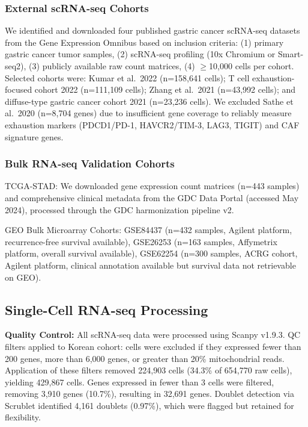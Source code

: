 \documentclass[12pt,twoside]{article}
\begin{document}
\subsubsection{External scRNA-seq Cohorts}

We identified and downloaded four published gastric cancer scRNA-seq datasets from the Gene Expression Omnibus based on inclusion criteria: (1) primary gastric cancer tumor samples, (2) scRNA-seq profiling (10x Chromium or Smart-seq2), (3) publicly available raw count matrices, (4) $\geq$10,000 cells per cohort. Selected cohorts were: Kumar et al.\ 2022 (n=158,641 cells); T cell exhaustion-focused cohort 2022 (n=111,109 cells); Zhang et al.\ 2021 (n=43,992 cells); and diffuse-type gastric cancer cohort 2021 (n=23,236 cells). We excluded Sathe et al.\ 2020 (n=8,704 genes) due to insufficient gene coverage to reliably measure exhaustion markers (PDCD1/PD-1, HAVCR2/TIM-3, LAG3, TIGIT) and CAF signature genes.

\subsubsection{Bulk RNA-seq Validation Cohorts}

TCGA-STAD: We downloaded gene expression count matrices (n=443 samples) and comprehensive clinical metadata from the GDC Data Portal (accessed May 2024), processed through the GDC harmonization pipeline v2.

GEO Bulk Microarray Cohorts: GSE84437 (n=432 samples, Agilent platform, recurrence-free survival available), GSE26253 (n=163 samples, Affymetrix platform, overall survival available), GSE62254 (n=300 samples, ACRG cohort, Agilent platform, clinical annotation available but survival data not retrievable on GEO).

\subsection{Single-Cell RNA-seq Processing}

\textbf{Quality Control:} All scRNA-seq data were processed using Scanpy v1.9.3. QC filters applied to Korean cohort: cells were excluded if they expressed fewer than 200 genes, more than 6,000 genes, or greater than 20\% mitochondrial reads. Application of these filters removed 224,903 cells (34.3\% of 654,770 raw cells), yielding 429,867 cells. Genes expressed in fewer than 3 cells were filtered, removing 3,910 genes (10.7\%), resulting in 32,691 genes. Doublet detection via Scrublet identified 4,161 doublets (0.97\%), which were flagged but retained for flexibility.
\end{document}
